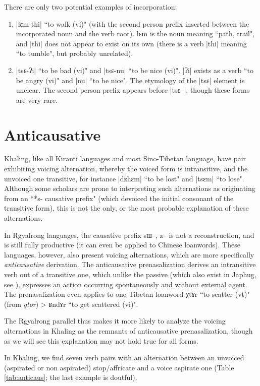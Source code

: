 \documentclass[oldfontcommands,oneside,a4paper,11pt]{article}
\newcommand{\ipa}[1]{{\phon #1}} %
\begin{document}
There are only two potential examples of incorporation:

\begin{enumerate}
\item |lɛm-thi| ``to walk (vi)" (with the second person prefix inserted between the incorporated noun and the verb root). \ipa{lɛ̄m} is the noun meaning ``path, trail", and |thi| does not appear to exist on its own (there is a verb |thi| meaning ``to tumble", but probably unrelated).
\item |tsɛ-ʔi| ``to be bad (vi)" and |tsɛ-nu| ``to be nice (vi)". |ʔi| exists as a verb ``to be angry (vi)" and |nu| ``to be nice". The etymology of the |tsɛ| element is unclear. The second person prefix appears before |tsɛ--|, though these forms are very rare.
\end{enumerate}

\section{Anticausative}
Khaling, like all Kiranti languages and most Sino-Tibetan language, have pair exhibiting voicing alternation, whereby the voiced form is intransitive, and the unvoiced one transitive, for instance |dzhɛm| ``to be lost" and |tsɛm| ``to lose". Although some scholars are prone to interpreting such alternations as originating from an ``*s- causative prefix" (which devoiced the initial consonant of the transitive form), this is not the only, or the most probable explanation of these alternations.

In Rgyalrong languages, the causative prefix \ipa{sɯ--, z--} is not a reconstruction, and is still fully productive (it can even be applied to Chinese loanwords). These languages, however, also present voicing alternations, which are more specifically \textit{anticausative} derivation. The anticausative prenasalization derives an intransitive verb out of a transitive one, which unlike the passive (which also exist in Japhug, see \citealt{jacques12demotion}), expresses an action occurring spontaneously and without external agent. The prenasalization even applies to one Tibetan loanword \ipa{χtɤr} ``to scatter (vt)" (from \textit{gtor}) > \ipa{ʁndɤr} ``to get scattered (vi)".


The Rgyalrong parallel thus makes it more likely to analyze the voicing alternations in Khaling as the remnants of anticausative prenasalization, though as we will see this explanation may not hold true for all forms.


In Khaling, we find seven verb pairs with an alternation between an unvoiced (aspirated or non aspirated) stop/affricate and a voice aspirate one (Table \ref{tab:anticaus}; the last example is doutful).
\end{document}
